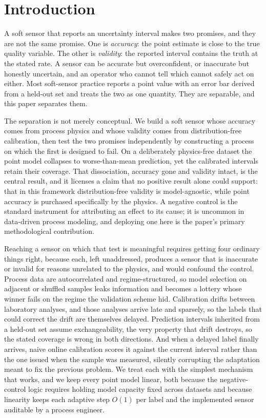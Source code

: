 \section{Introduction}
\label{sec:intro}

A soft sensor that reports an uncertainty interval makes two promises, and they are
not the same promise. One is \emph{accuracy}: the point estimate is close to the true
quality variable. The other is \emph{validity}: the reported interval contains the
truth at the stated rate. A sensor can be accurate but overconfident, or inaccurate but
honestly uncertain, and an operator who cannot tell which cannot safely act on either.
Most soft-sensor practice reports a point value with an error bar derived from a
held-out set and treats the two as one quantity. They are separable, and this paper
separates them.

The separation is not merely conceptual. We build a soft sensor whose accuracy comes
from process physics and whose validity comes from distribution-free calibration, then
test the two promises independently by constructing a process on which the first is
designed to fail. On a deliberately physics-free dataset the point model collapses to
worse-than-mean prediction, yet the calibrated intervals retain their coverage. That
dissociation, accuracy gone and validity intact, is the central result, and it licenses
a claim that no positive result alone could support: that in this framework
distribution-free validity is model-agnostic, while point accuracy is purchased
specifically by the physics. A negative control is the standard instrument for
attributing an effect to its cause; it is uncommon in data-driven process modeling, and
deploying one here is the paper's primary methodological contribution.

Reaching a sensor on which that test is meaningful requires getting four ordinary things
right, because each, left unaddressed, produces a sensor that is inaccurate or invalid
for reasons unrelated to the physics, and would confound the control. Process data are
autocorrelated and regime-structured, so model selection on adjacent or shuffled samples
leaks information and becomes a lottery whose winner fails on the regime the validation
scheme hid. Calibration drifts between laboratory analyses, and those analyses arrive
late and sparsely, so the labels that could correct the drift are themselves delayed.
Prediction intervals inherited from a held-out set assume exchangeability, the very
property that drift destroys, so the stated coverage is wrong in both directions. And
when a delayed label finally arrives, naive online calibration scores it against the
current interval rather than the one issued when the sample was measured, silently
corrupting the adaptation meant to fix the previous problem. We treat each with the
simplest mechanism that works, and we keep every point model linear, both because the
negative-control logic requires holding model capacity fixed across datasets and because
linearity keeps each adaptive step $O(1)$ per label and the implemented sensor auditable
by a process engineer.

